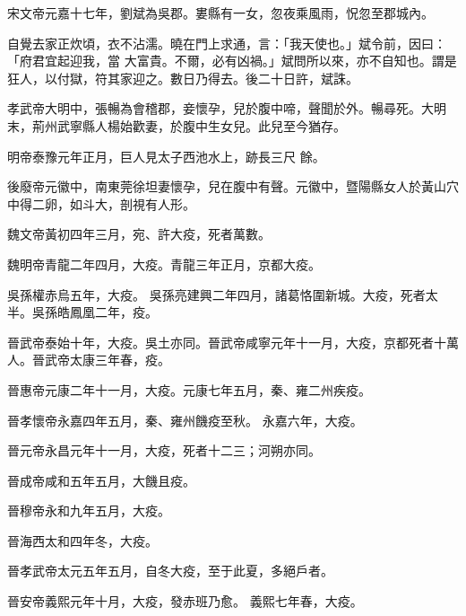 \begin{pinyinscope}
 宋文帝元嘉十七年，劉斌為吳郡。婁縣有一女，忽夜乘風雨，怳忽至郡城內。



 自覺去家正炊頃，衣不沾濡。曉在門上求通，言：「我天使也。」斌令前，因曰：「府君宜起迎我，當
 大富貴。不爾，必有凶禍。」斌問所以來，亦不自知也。謂是狂人，以付獄，符其家迎之。數日乃得去。後二十日許，斌誅。



 孝武帝大明中，張暢為會稽郡，妾懷孕，兒於腹中啼，聲聞於外。暢尋死。大明末，荊州武寧縣人楊始歡妻，於腹中生女兒。此兒至今猶存。



 明帝泰豫元年正月，巨人見太子西池水上，跡長三尺
 餘。



 後廢帝元徽中，南東莞徐坦妻懷孕，兒在腹中有聲。元徽中，暨陽縣女人於黃山穴中得二卵，如斗大，剖視有人形。



 魏文帝黃初四年三月，宛、許大疫，死者萬數。



 魏明帝青龍二年四月，大疫。青龍三年正月，京都大疫。



 吳孫權赤烏五年，大疫。
 吳孫亮建興二年四月，諸葛恪圍新城。大疫，死者太半。吳孫皓鳳凰二年，疫。



 晉武帝泰始十年，大疫。吳土亦同。晉武帝咸寧元年十一月，大疫，京都死者十萬人。晉武帝太康三年春，疫。



 晉惠帝元康二年十一月，大疫。元康七年五月，秦、雍二州疾疫。



 晉孝懷帝永嘉四年五月，秦、雍州饑疫至秋。
 永嘉六年，大疫。



 晉元帝永昌元年十一月，大疫，死者十二三；河朔亦同。



 晉成帝咸和五年五月，大饑且疫。



 晉穆帝永和九年五月，大疫。



 晉海西太和四年冬，大疫。



 晉孝武帝太元五年五月，自冬大疫，至于此夏，多絕戶者。



 晉安帝義熙元年十月，大疫，發赤班乃愈。
 義熙七年春，大疫。




\end{pinyinscope}
